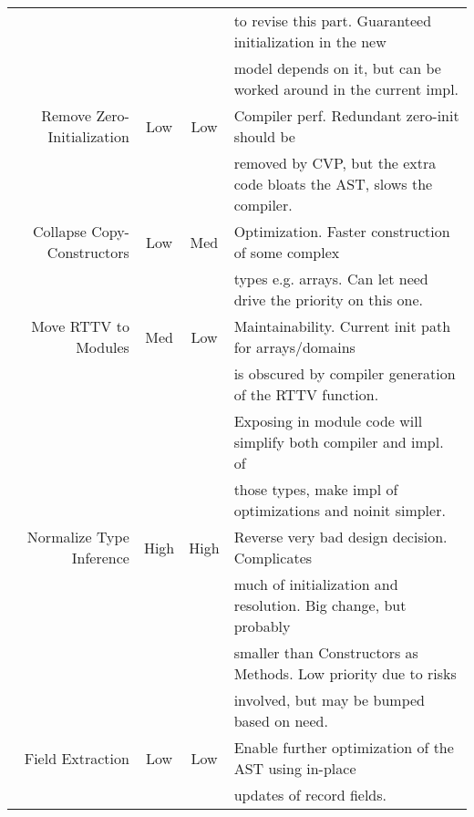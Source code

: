 \begin{tabular}{|r|c|c|l|}
 & & & to revise this part. Guaranteed initialization in the new \\
 & & & model depends on it, but can be worked around in the current impl. \\ \hline
Remove Zero-Initialization & Low & Low & Compiler perf. Redundant zero-init should be \\
 & & & removed by CVP, but the extra code bloats the AST, slows the compiler. \\ \hline
Collapse Copy-Constructors & Low & Med & Optimization. Faster construction of some complex \\
 & & & types e.g. arrays. Can let need drive the priority on this one. \\ \hline
Move RTTV to Modules & Med & Low & Maintainability. Current init path for arrays/domains \\
 & & & is obscured by compiler generation of the RTTV function. \\
 & & & Exposing in module code will simplify both compiler and impl. of \\
 & & & those types, make impl of optimizations and noinit simpler. \\ \hline
Normalize Type Inference & High & High & Reverse very bad design decision. Complicates \\
 & & & much of initialization and resolution. Big change, but probably \\
 & & & smaller than Constructors as Methods. Low priority due to risks \\
 & & & involved, but may be bumped based on need. \\ \hline
Field Extraction & Low & Low & Enable further optimization of the AST using in-place \\
 & & & updates of record fields. \\ \hline
\end{tabular}

